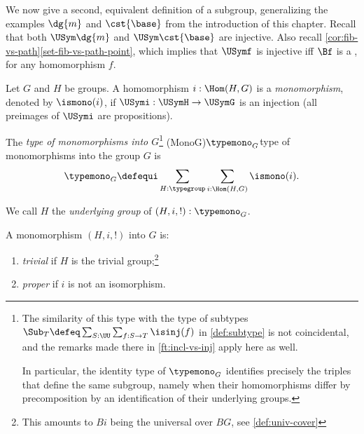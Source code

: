 We now give a second, equivalent definition of a subgroup,
generalizing the examples $\dg{m}$ and $\cst{\base}$ from
the introduction of this chapter. Recall that both
$\USym\dg{m}$ and $\USym\cst{\base}$ are injective.
Also recall \cref{cor:fib-vs-path}\ref{set-fib-vs-path-point},
which implies that $\USymf$ is injective iff $\Bf$ is a \covering,
for any homomorphism $f$.


\begin{definition}
  \label{def:typeofmono}
  Let $G$ and $H$ be groups. A homomorphism $i: \Hom(H,G)$ is
  a \emph{monomorphism}, denoted by $\ismono(i)$,
  if $\USymi:\USymH\to \USymG$ is an injection  
  (all preimages of $\USymi$ are propositions).
  
  The \emph{type of monomorphisms into $G$}\footnote{%
  The similarity of this type with the type of subtypes
  $\Sub_T \defeq \sum_{S:\UU}\sum_{f:S\to T}\isinj(f)$ in
  \cref{def:subtype} is not coincidental, and the remarks made 
  there in \cref{ft:incl-vs-inj} apply here as well.
  
  In particular, the identity type of $\typemono_G$
  identifies precisely the triples that define the same subgroup,
  namely when their homomorphisms differ by precomposition by an 
  identification of their underlying groups.
  
  }
  \glossary(MonoG){$\protect{\typemono_G}$}{type of monomorphisms%
  into the group $G$} 
  is
  \[
  \typemono_G\defequi\sum_{H:\typegroup}\sum_{i:\Hom(H,G)}\ismono(i).
  \]
  
  We call $H$ the \emph{underlying group} of $(H,i,!) : \typemono_G$.
  
  A monomorphism $(H,i,!)$ into $G$ is:
      \begin{enumerate}
      \item \emph{trivial} 
      if $H$ is the trivial group;\footnote{This amounts to $Bi$
      being the universal \covering over $BG$, see \cref{def:univ-cover}}
      \item \emph{proper} if $i$ is 
      not an isomorphism.\qedhere
      \end{enumerate}
\end{definition}
    
